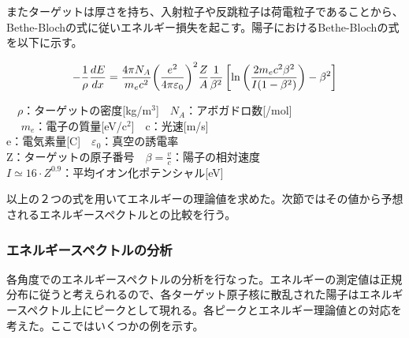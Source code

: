 \documentclass[a4paper,11pt,dvipdfmx]{jsarticle}
\begin{document}
\newpage
またターゲットは厚さを持ち、入射粒子や反跳粒子は荷電粒子であることから、Bethe-Blochの式に従いエネルギー損失を起こす。陽子におけるBethe-Blochの式を以下に示す。

\vspace*{2mm}

\begin{equation}
\centering
\large
 -\frac{1}{\rho}\frac{dE}{dx} = \frac{4\pi{N_A}}{{m_e}c^2}{\left( \frac{e^2}{4\pi\varepsilon_0}\right)}^2\frac{Z}{A}\frac{1}{\beta^2}\left[\ln{\left(\frac{2m_ec^2\beta^2}{I(1-\beta^2)} \right)-\beta^2}\right]
  \label{BB}
\end{equation}

\vspace*{2mm}

\begin{center}
\begin{small}
　$\rho$：ターゲットの密度[kg/m$^3$]　$N_A$：アボガドロ数[/mol] \\
　\vspace*{1mm}
  $m_e$：電子の質量[eV/c$^2$]　c：光速[m/s] \\
  e：電気素量[C]　$\varepsilon_0$：真空の誘電率 \\
  \vspace*{0.5mm}
  Z：ターゲットの原子番号　$\beta=\frac{v}{c}：陽子の相対速度$ \\
  $I\simeq16\cdot{Z^{0.9}}$：平均イオン化ポテンシャル[eV]
\end{small}
\end{center}

\noindent
以上の２つの式を用いてエネルギーの理論値を求めた。次節ではその値から予想されるエネルギースペクトルとの比較を行う。\\

\subsubsection{エネルギースペクトルの分析}
各角度でのエネルギースペクトルの分析を行なった。エネルギーの測定値は正規分布に従うと考えられるので、各ターゲット原子核に散乱された陽子はエネルギースペクトル上にピークとして現れる。各ピークとエネルギー理論値との対応を考えた。ここではいくつかの例を示す。\\
\end{document}
